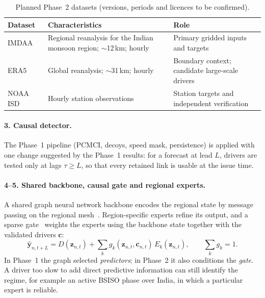\begin{table}[htbp]
\centering
\caption{Planned Phase~2 datasets (versions, periods and licences to be confirmed).}
\label{tab:p2-data}
\footnotesize
\renewcommand{\arraystretch}{1.15}
\begin{tabularx}{\textwidth}{>{\raggedright\arraybackslash}p{2.2cm}>{\raggedright\arraybackslash}p{4.2cm}>{\raggedright\arraybackslash}X}
\toprule
\textbf{Dataset} & \textbf{Characteristics} & \textbf{Role} \\
\midrule
IMDAA~\cite{rani2021imdaa} & Regional reanalysis for the Indian monsoon region; $\sim$12\,km; hourly & Primary gridded inputs and targets \\
ERA5~\cite{hersbach2020era5} & Global reanalysis; $\sim$31\,km; hourly & Boundary context; candidate large-scale drivers \\
NOAA ISD~\cite{smith2011integrated} & Hourly station observations & Station targets and independent verification \\
\bottomrule
\end{tabularx}
\end{table}

\paragraph{3. Causal detector.} The Phase~1 pipeline (PCMCI, decoys, speed mask, persistence) is applied with one change suggested by the Phase~1 results: for a forecast at lead $L$, drivers are tested only at lags $\tau\ge L$, so that every retained link is usable at the issue time.

\paragraph{4--5. Shared backbone, causal gate and regional experts.} A shared graph neural network backbone encodes the regional state by message passing on the regional mesh~\cite{lam2023learning,oskarsson2023graph}. Region-specific experts refine its output, and a sparse gate~\cite{shazeer2017outrageously} weights the experts using the backbone state together with the validated drivers $\mathbf{c}$:
\begin{equation}
  \hat{\mathbf{y}}_{n,t+L}=D(\mathbf{z}_{n,t})+\sum_{k} g_k(\mathbf{z}_{n,t},\mathbf{c}_{n,t})\,E_k(\mathbf{z}_{n,t}),\qquad \textstyle\sum_k g_k=1 .
\end{equation}
In Phase~1 the graph selected \emph{predictors}; in Phase~2 it also conditions the \emph{gate}. A driver too slow to add direct predictive information can still identify the regime, for example an active BSISO phase over India, in which a particular expert is reliable.

